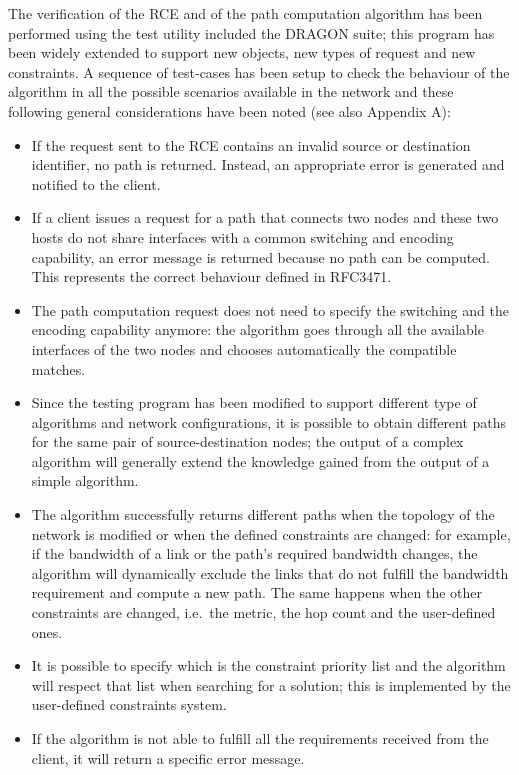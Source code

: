\documentclass[10pt,a4paper]{report}
\begin{document}
The verification of the RCE and of the path computation algorithm has
been performed using the test utility included the DRAGON suite; this
program has been widely extended to support new objects, new types of
request and new constraints. A sequence of test-cases has been setup
to check the behaviour of the algorithm in all the possible scenarios
available in the network and these following general considerations
have been noted (see also Appendix A):
\begin{itemize}
\item If the request sent to the RCE contains an invalid source or
  destination identifier, no path is returned. Instead, an appropriate
  error is generated and notified to the client.
\item If a client issues a request for a path that connects two nodes
  and these two hosts do not share interfaces with a common switching
  and encoding capability, an error message is returned because no
  path can be computed. This represents the correct behaviour defined
  in RFC3471.
\item The path computation request does not need to specify the
  switching and the encoding capability anymore: the algorithm goes
  through all the available interfaces of the two nodes and chooses
  automatically the compatible matches.
\item Since the testing program has been modified to support different
  type of algorithms and network configurations, it is possible to
  obtain different paths for the same pair of source-destination
  nodes; the output of a complex algorithm will generally extend the
  knowledge gained from the output of a simple algorithm.
\item The algorithm successfully returns different paths when the
  topology of the network is modified or when the defined constraints
  are changed: for example, if the bandwidth of a link or the path's
  required bandwidth changes, the algorithm will dynamically exclude
  the links that do not fulfill the bandwidth requirement and compute
  a new path. The same happens when the other constraints are changed,
  i.e.\ the metric, the hop count and the user-defined ones.
\item It is possible to specify which is the constraint priority list and
  the algorithm will respect that list when searching for a solution;
  this is implemented by the user-defined constraints system.
\item If the algorithm is not able to fulfill all the requirements
  received from the client, it will return a specific error message.
\end{itemize}
\end{document}
